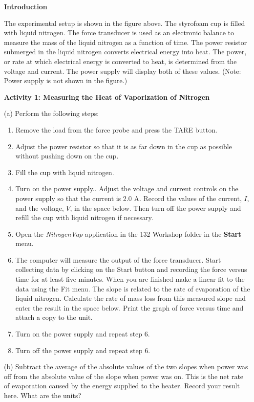 \textbf{Introduction}

The experimental setup is shown in the figure above. The styrofoam
cup is filled with liquid nitrogen. The force transducer is used as
an electronic balance to measure the mass of the liquid nitrogen as
a function of time. The power resistor submerged in the liquid nitrogen
converts electrical energy into heat. The power, or rate at which
electrical energy is converted to heat, is determined from
the voltage and current.  The power supply will
display both of these values.
(Note: Power supply is
not shown in the figure.)

\textbf{Activity 1: Measuring the Heat of Vaporization of Nitrogen}

(a) Perform the following steps:

\begin{enumerate}
\item Remove the load from the force probe and press the TARE button.
\item Adjust the power resistor so that it is as far down in the cup as
possible without pushing down on the cup.
\item Fill the cup with liquid nitrogen.
\item Turn on the power supply.. Adjust the voltage and
current controls on the power supply so that the current is
2.0 A. Record the values of the current, $I$, and the voltage, $V$,
in the space below. Then turn off the power supply and refill the
cup with liquid nitrogen if necessary.\answerspace{1in}

\item Open the \textit{NitrogenVap} application in the 132 Workshop folder
in the {\bf Start} menu.
\item The computer will measure the output of the force transducer. 
Start collecting data by clicking on the Start button and
recording the force versus time for at least five minutes. When you
are finished make a linear fit to the data using the Fit menu. The
slope is related to the rate of evaporation of the liquid nitrogen.
Calculate the rate of mass loss from this measured slope and enter
the result in the space below. Print the graph of force versus time
and attach a copy to the unit. \answerspace{0.75in}

\item Turn on the power supply and repeat step 6.
\item Turn off the power supply and repeat step 6.
\end{enumerate}
(b) Subtract the average of the absolute values of the two slopes
when power was off from the absolute value of the slope when power
was on. This is the net rate of evaporation caused by the energy supplied
to the heater. Record your result here. What are the units?
\answerspace{20mm}

